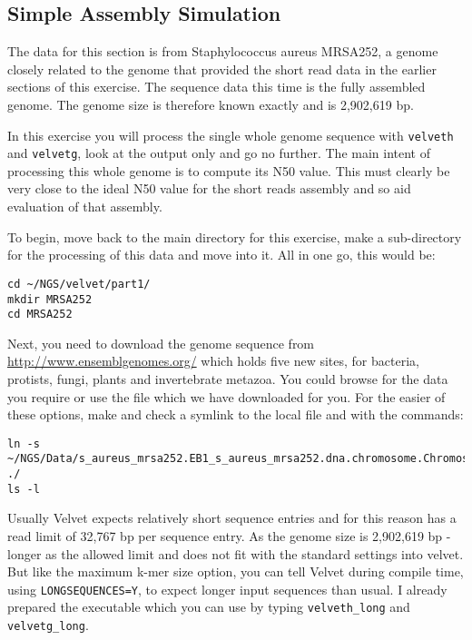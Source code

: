 \subsection{Simple Assembly Simulation}

\begin{note}
The data for this section is from Staphylococcus aureus MRSA252, a genome
closely related to the genome that provided the short read data in the earlier
sections of this exercise. The sequence data this time is the fully assembled
genome. The genome size is therefore known exactly and is 2,902,619 bp.
\end{note}

\begin{information}
In this exercise you will process the single whole genome sequence with \texttt{velveth}
and \texttt{velvetg}, look at the output only and go no further. The main intent of
processing this whole genome is to compute its N50 value. This must clearly be
very close to the ideal N50 value for the short reads assembly and so aid
evaluation of that assembly.
\end{information}

\begin{steps}
To begin, move back to the main directory for this exercise, make a
sub-directory for the processing of this data and move into it. All in one go,
this would be:
\begin{lstlisting}
cd ~/NGS/velvet/part1/ 
mkdir MRSA252 
cd MRSA252
\end{lstlisting}

Next, you need to download the genome sequence from
\url{http://www.ensemblgenomes.org/} which holds five new sites, for bacteria,
protists, fungi, plants and invertebrate metazoa. You could browse for the data
you require or use the file which we have downloaded for you. For the easier of
these options, make and check a symlink to the local file and with the
commands:
\begin{lstlisting}
ln -s ~/NGS/Data/s_aureus_mrsa252.EB1_s_aureus_mrsa252.dna.chromosome.Chromosome.fa.gz ./
ls -l
\end{lstlisting}

\end{steps}

\begin{note}
Usually Velvet expects relatively short sequence entries and for this reason has
a read limit of 32,767 bp per sequence entry. As the genome size is 2,902,619 bp
- longer as the allowed limit and does not fit with the standard settings into
velvet. But like the maximum k-mer size option, you can tell Velvet during
compile time, using \texttt{LONGSEQUENCES=Y}, to expect longer input sequences
than usual. I already prepared the executable which you can use by typing
\texttt{velveth\_long} and \texttt{velvetg\_long}.
\end{note}


